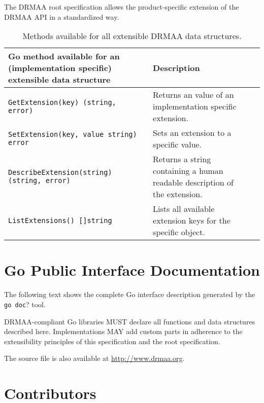 \documentclass{article}
\newcommand{\h}[1]{\texttt{#1}}
\begin{document}
The DRMAA root specification allows the product-specific extension of the DRMAA API in a standardized way.

\begin{table}[ht]
\centering
\begin{tabularx}{\textwidth}{|X|X|l|X|}
\hline
Go method available for an (implementation specific) extensible data structure & Description \\
\hline
\h{GetExtension(key) (string, error)} & Returns an value of an implementation specific extension. \\
\h{SetExtension(key, value string) error} & Sets an extension to a specific value. \\
\h{DescribeExtension(string) (string, error)} & Returns a string containing a human readable description of the extension.\\
\h{ListExtensions() []string} & Lists all available extension keys for the specific object. \\
\hline
\end{tabularx}
\caption{Methods available for all extensible DRMAA data structures.}
\label{tab:naming}
\end{table}


\section{Go Public Interface Documentation}
\label{sec:idl}

The following text shows the complete Go interface description generated by the \h{go doc}? tool.

DRMAA-compliant Go libraries MUST declare all functions and data structures described here. Implementations MAY add custom parts in adherence to the extensibility principles of this specification and the root specification.

The source file is also available at \url{http://www.drmaa.org}.



\newpage

\section{Contributors}
\end{document}
